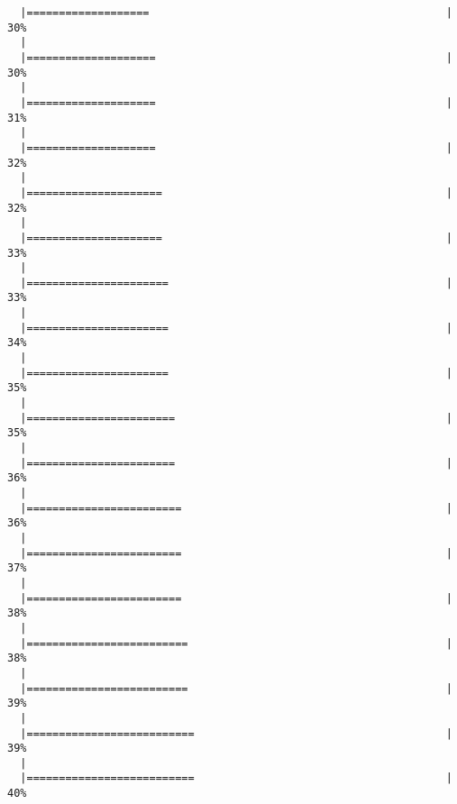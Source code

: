 \begin{knitrout}
\begin{kframe}
\begin{verbatim}
  |===================                                              |  30%
  |                                                                       
  |====================                                             |  30%
  |                                                                       
  |====================                                             |  31%
  |                                                                       
  |====================                                             |  32%
  |                                                                       
  |=====================                                            |  32%
  |                                                                       
  |=====================                                            |  33%
  |                                                                       
  |======================                                           |  33%
  |                                                                       
  |======================                                           |  34%
  |                                                                       
  |======================                                           |  35%
  |                                                                       
  |=======================                                          |  35%
  |                                                                       
  |=======================                                          |  36%
  |                                                                       
  |========================                                         |  36%
  |                                                                       
  |========================                                         |  37%
  |                                                                       
  |========================                                         |  38%
  |                                                                       
  |=========================                                        |  38%
  |                                                                       
  |=========================                                        |  39%
  |                                                                       
  |==========================                                       |  39%
  |                                                                       
  |==========================                                       |  40%

\end{verbatim}
\end{kframe}
\end{knitrout}
